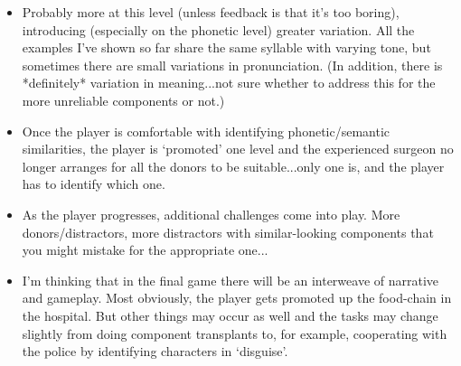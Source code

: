\documentclass{article}
\begin{document}
\begin{itemize}
  \item Probably more at this level (unless feedback is that it's too boring), introducing (especially on the phonetic level) greater variation. All the examples I've shown so far share the same syllable with varying tone, but sometimes there are small variations in pronunciation. (In addition, there is *definitely* variation in meaning...not sure whether to address this for the more unreliable components or not.)
  \item Once the player is comfortable with identifying phonetic/semantic similarities, the player is `promoted' one level and the experienced surgeon no longer arranges for all the donors to be suitable...only one is, and the player has to identify which one.
  \item As the player progresses, additional challenges come into play. More donors/distractors, more distractors with similar-looking components that you might mistake for the appropriate one...
  \item I'm thinking that in the final game there will be an interweave of narrative and gameplay. Most obviously, the player gets promoted up the food-chain in the hospital. But other things may occur as well and the tasks may change slightly from doing component transplants to, for example, cooperating with the police by identifying characters in `disguise'.
\end{itemize}
\end{document}
